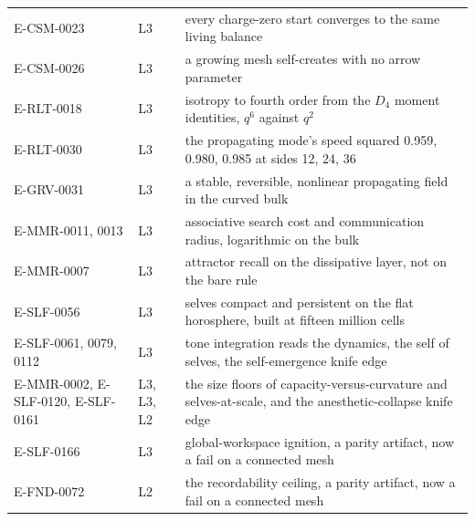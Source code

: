 \begin{small}
\begin{longtable}{@{}p{3.6cm}lp{8.6cm}@{}}
E-CSM-0023 & L3 & every charge-zero start converges to the same living balance \\
E-CSM-0026 & L3 & a growing mesh self-creates with no arrow parameter \\
E-RLT-0018 & L3 & isotropy to fourth order from the $D_4$ moment identities, $q^6$ against $q^2$ \\
E-RLT-0030 & L3 & the propagating mode's speed squared 0.959, 0.980, 0.985 at sides 12, 24, 36 \\
E-GRV-0031 & L3 & a stable, reversible, nonlinear propagating field in the curved bulk \\
E-MMR-0011, 0013 & L3 & associative search cost and communication radius, logarithmic on the bulk \\
E-MMR-0007 & L3 & attractor recall on the dissipative layer, not on the bare rule \\
E-SLF-0056 & L3 & selves compact and persistent on the flat horosphere, built at fifteen million cells \\
E-SLF-0061, 0079, 0112 & L3 & tone integration reads the dynamics, the self of selves, the self-emergence knife edge \\
E-MMR-0002, E-SLF-0120, E-SLF-0161 & L3, L3, L2 & the size floors of capacity-versus-curvature and selves-at-scale, and the anesthetic-collapse knife edge \\
E-SLF-0166 & L3 & global-workspace ignition, a parity artifact, now a fail on a connected mesh \\
E-FND-0072 & L2 & the recordability ceiling, a parity artifact, now a fail on a connected mesh \\
\bottomrule
\end{longtable}
\end{small}
